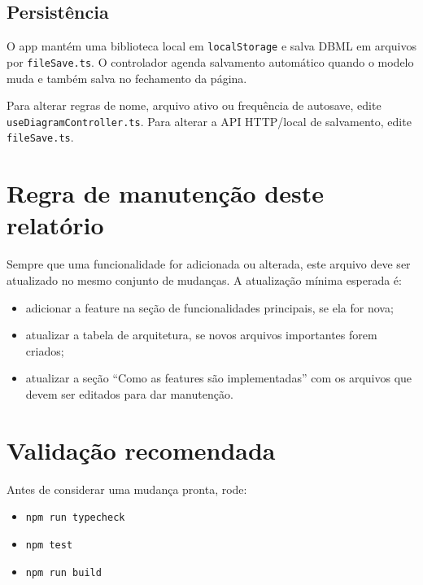 \documentclass[11pt,a4paper]{article}
\begin{document}
\subsection{Persistência}

O app mantém uma biblioteca local em \texttt{localStorage} e salva DBML em arquivos por \texttt{fileSave.ts}. O controlador agenda salvamento automático quando o modelo muda e também salva no fechamento da página.

Para alterar regras de nome, arquivo ativo ou frequência de autosave, edite \texttt{useDiagramController.ts}. Para alterar a API HTTP/local de salvamento, edite \texttt{fileSave.ts}.

\section{Regra de manutenção deste relatório}

Sempre que uma funcionalidade for adicionada ou alterada, este arquivo deve ser atualizado no mesmo conjunto de mudanças. A atualização mínima esperada é:

\begin{itemize}
  \item adicionar a feature na seção de funcionalidades principais, se ela for nova;
  \item atualizar a tabela de arquitetura, se novos arquivos importantes forem criados;
  \item atualizar a seção ``Como as features são implementadas'' com os arquivos que devem ser editados para dar manutenção.
\end{itemize}

\section{Validação recomendada}

Antes de considerar uma mudança pronta, rode:

\begin{itemize}
  \item \texttt{npm run typecheck}
  \item \texttt{npm test}
  \item \texttt{npm run build}
\end{itemize}
\end{document}
